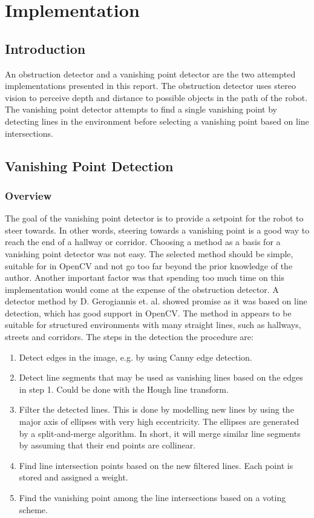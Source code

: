 \chapter{Implementation}\label{chp:implementation}

\section{Introduction}

An obstruction detector and a vanishing point detector are the two attempted implementations presented in this report. The obstruction detector uses stereo vision to perceive depth and distance to possible objects in the path of the robot. The vanishing point detector attempts to find a single vanishing point by detecting lines in the environment before selecting a vanishing point based on line intersections. 

\section{Vanishing Point Detection}

\subsection{Overview}

The goal of the vanishing point detector is to provide a setpoint for the robot to steer towards. In other words, steering towards a vanishing point is a good way to reach the end of a hallway or corridor. Choosing a method as a basis for a vanishing point detector was not easy. The selected method should be simple, suitable for in OpenCV and not go too far beyond the prior knowledge of the author. Another important factor was that spending too much time on this implementation would come at the expense of the obstruction detector. A detector method by D. Gerogiannis et. al. \cite{gerogiannisvp} showed promise as it was based on line detection, which has good support in OpenCV. The method in \cite{gerogiannisvp} appears to be suitable for structured environments with many straight lines, such as hallways, streets and corridors. The steps in the detection the procedure are:

\begin{enumerate}
	\item Detect edges in the image, e.g. by using Canny edge detection.
	\item Detect line segments that may be used as vanishing lines based on the edges in step 1. Could be done with the Hough line transform.
	\item Filter the detected lines. This is done by modelling new lines by using the major axis of ellipses with very high eccentricity. The ellipses are generated by a split-and-merge algorithm. In short, it will merge similar line segments by assuming that their end points are collinear.
	\item Find line intersection points based on the new filtered lines. Each point is stored and assigned a weight.
	\item Find the vanishing point among the line intersections based on a voting scheme. 
\end{enumerate}


